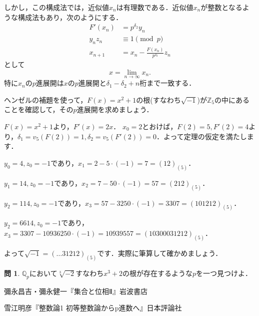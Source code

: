 \documentclass[uplatex]{jsarticle}
\newcommand{\Z}{\mathbb{Z}}
\newcommand{\Q}{\mathbb{Q}}
\theoremstyle{definition} %
\newtheorem*{exercise*}{問}
\begin{document}
しかし，この構成法では，近似値$x_n$は有理数である．近似値$x_n$が整数となるような構成法もあり，次のようにする．
\begin{align*}
F'(x_n) &= p^{\delta_2} y_n\\
y_n z_n &\equiv 1 \pmod p\\
x_{n+1} &= x_n - \frac{F(x_n)}{p^{\delta_2}} z_n
\end{align*}
として
\[x = \lim_{n\to\infty}x_n.\]
特に$x_n$の$p$進展開は$x$の$p$進展開と$\delta_1 - \delta_2 + n$桁まで一致する．

ヘンゼルの補題を使って，$F(x) = x^2+1$の根(すなわち$\sqrt{-1}$)が$\Z_5$の中にあることを確認して，その$p$進展開を求めましょう．

$F(x) = x^2+1$より，$F'(x) = 2x$．
$x_0 = 2$とおけば，$F(2) = 5, F'(2) = 4$より，$\delta_1 = v_5(F(2)) = 1, \delta_2 = v_5(F'(2)) = 0$．よって定理の仮定を満たします．

$y_0 = 4, z_0 = -1$であり，$x_1 = 2 - 5 \cdot (-1) = 7 = (12)_{(5)}$．

$y_1 = 14, z_0 = -1$であり，$x_2 = 7 - 50 \cdot (-1) = 57 = (212)_{(5)}$．

$y_2 = 114, z_0 = -1$であり，$x_3 = 57 - 3250 \cdot (-1) = 3307 = (101212)_{(5)}$．

$y_2 = 6614, z_0 = -1$であり，$x_3 = 3307 - 10936250 \cdot (-1) = 10939557 = (10300031212)_{(5)}$．

よって$\sqrt{-1} = (\dots31212)_{(5)}$です．実際に筆算して確かめましょう．

\begin{exercise*}
$\Q_p$において$\sqrt[3]{-2}$すなわち$x^3+2$の根が存在するような$p$を一つ見つけよ．
\end{exercise*}



\begin{thebibliography}{9}
\item 彌永昌吉・彌永健一『集合と位相Ⅱ』岩波書店
\item 雪江明彦『整数論1 初等整数論からp進数へ』日本評論社
\end{thebibliography}
\end{document}
